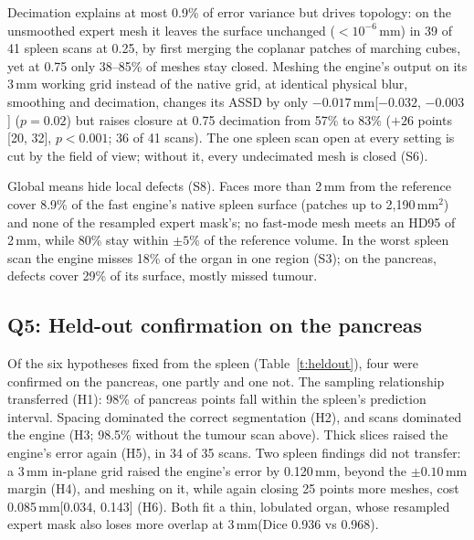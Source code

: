 \documentclass[conference]{IEEEtran}
\newcommand{\mm}{\,mm\xspace}
\begin{document}
Decimation explains at most 0.9\% of error variance but drives topology: on the unsmoothed expert mesh it leaves the surface unchanged ($<10^{-6}$\mm) in 39 of 41 spleen scans at 0.25, by first merging the coplanar patches of marching cubes, yet at 0.75 only 38--85\% of meshes stay closed. Meshing the engine's output on its 3\mm working grid instead of the native grid, at identical physical blur, smoothing and decimation, changes its ASSD by only $-0.017$\mm [$-0.032$, $-0.003$] ($p=0.02$) but raises closure at 0.75 decimation from 57\% to 83\% ($+26$ points [20, 32], $p<0.001$; 36 of 41 scans). The one spleen scan open at every setting is cut by the field of view; without it, every undecimated mesh is closed (S6).

Global means hide local defects (S8). Faces more than 2\mm from the reference cover 8.9\% of the fast engine's native spleen surface (patches up to 2{,}190\,mm$^2$) and none of the resampled expert mask's; no fast-mode mesh meets an HD95 of 2\mm, while 80\% stay within $\pm5\%$ of the reference volume. In the worst spleen scan the engine misses 18\% of the organ in one region (S3); on the pancreas, defects cover 29\% of its surface, mostly missed tumour.

\subsection{Q5: Held-out confirmation on the pancreas}
Of the six hypotheses fixed from the spleen (Table~\ref{t:heldout}), four were confirmed on the pancreas, one partly and one not. The sampling relationship transferred (H1): 98\% of pancreas points fall within the spleen's prediction interval. Spacing dominated the correct segmentation (H2), and scans dominated the engine (H3; 98.5\% without the tumour scan above). Thick slices raised the engine's error again (H5), in 34 of 35 scans. Two spleen findings did not transfer: a 3\mm in-plane grid raised the engine's error by 0.120\mm, beyond the $\pm0.10$\mm margin (H4), and meshing on it, while again closing 25 points more meshes, cost 0.085\mm [0.034, 0.143] (H6). Both fit a thin, lobulated organ, whose resampled expert mask also loses more overlap at 3\mm (Dice 0.936 vs 0.968).

\begin{table}[!t]
\caption{Held-out confirmation, TS fast. $^a$Criteria fixed before the pancreas scans were processed: H1 MAE $\leq0.074$\mm; H2 resolution has the largest $\eta^2$ (\%, vs scans); H3 scan $\eta^2$ (\%) above resolution and random-intercept (RI) share above 50\%; H4 CI of the ASSD change (mm) within $\pm0.10$; H5 CI above 0; H6 closure gain at 0.75 decimation with CI above 0 and $|\Delta\text{ASSD}|\leq0.05$\mm. $^b$Leave-one-scan-out.}
\label{t:heldout}
\centering\scriptsize
\setlength{\tabcolsep}{2pt}

\end{table}
\end{document}
